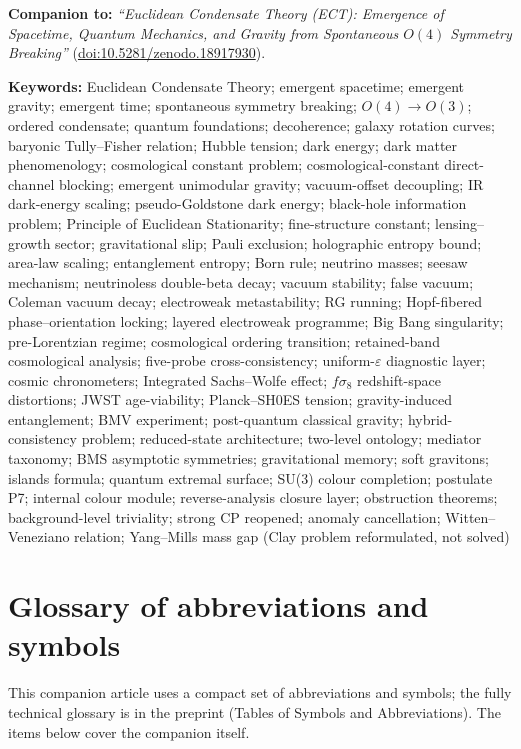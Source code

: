 \documentclass[11pt,a4paper]{article}
\begin{document}
\noindent\textbf{Companion to:}
\emph{``Euclidean Condensate Theory (ECT): Emergence of Spacetime,
Quantum Mechanics, and Gravity from Spontaneous $O(4)$ Symmetry
Breaking''}
(\href{https://doi.org/10.5281/zenodo.18917930}{doi:10.5281/zenodo.18917930}).

\medskip
\noindent\textbf{Keywords:}
Euclidean Condensate Theory; emergent spacetime; emergent gravity;
emergent time; spontaneous symmetry breaking; $O(4)\to O(3)$;
ordered condensate; quantum foundations; decoherence;
galaxy rotation curves; baryonic Tully--Fisher relation;
Hubble tension; dark energy; dark matter phenomenology;
cosmological constant problem; cosmological-constant direct-channel blocking;
emergent unimodular gravity; vacuum-offset decoupling;
IR dark-energy scaling; pseudo-Goldstone dark energy;
black-hole information problem; Principle of Euclidean Stationarity;
fine-structure constant; lensing--growth sector;
gravitational slip; Pauli exclusion;
holographic entropy bound; area-law scaling;
entanglement entropy;
Born rule;
neutrino masses; seesaw mechanism;
neutrinoless double-beta decay;
vacuum stability; false vacuum; Coleman vacuum decay;
electroweak metastability; RG running;
Hopf-fibered phase--orientation locking; layered electroweak programme;
Big Bang singularity; pre-Lorentzian regime;
cosmological ordering transition;
retained-band cosmological analysis; five-probe cross-consistency;
uniform-$\varepsilon$ diagnostic layer; cosmic chronometers;
Integrated Sachs--Wolfe effect; $f\sigma_8$ redshift-space distortions;
JWST age-viability; Planck--SH0ES tension;
gravity-induced entanglement; BMV experiment;
post-quantum classical gravity;
hybrid-consistency problem; reduced-state architecture;
two-level ontology; mediator taxonomy;
BMS asymptotic symmetries; gravitational memory; soft gravitons;
islands formula; quantum extremal surface;
SU(3) colour completion; postulate P7;
internal colour module; reverse-analysis closure layer;
obstruction theorems; background-level triviality;
strong CP reopened; anomaly cancellation;
Witten--Veneziano relation;
Yang--Mills mass gap (Clay problem reformulated, not solved)

\newpage
\section*{Glossary of abbreviations and symbols}

This companion article uses a compact set of abbreviations and symbols;
the fully technical glossary is in the preprint (Tables of Symbols and
Abbreviations). The items below cover the companion itself.
\end{document}
